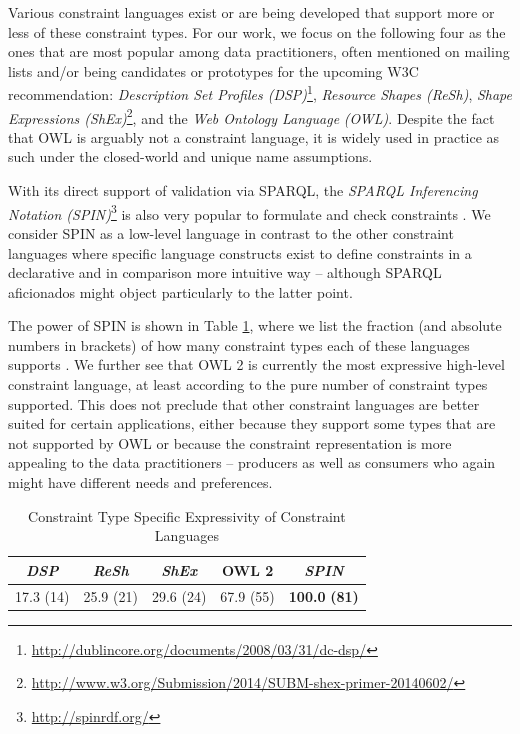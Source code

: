 \documentclass[a4paper,fontsize=11pt]{scrartcl}
\begin{document}
Various constraint languages exist or are being developed that support more or less of these constraint types. For our work, we focus on the following four as the ones that are most popular among data practitioners, often mentioned on mailing lists and/or being candidates or prototypes for the upcoming W3C recommendation:
\emph{Description Set Profiles (DSP)}\footnote{\url{ http://dublincore.org/documents/2008/03/31/dc-dsp/}}, \emph{Resource Shapes (ReSh)}, \emph{Shape Expressions (ShEx)}\footnote{\url{http://www.w3.org/Submission/2014/SUBM-shex-primer-20140602/}}, and the \emph{Web Ontology Language} \emph{(OWL)}. Despite the fact that OWL is arguably not a constraint language, it is widely used in practice as such under the closed-world and unique name assumptions.

With its direct support of validation via SPARQL, the \emph{SPARQL Inferencing Notation (SPIN)}\footnote{\url{http://spinrdf.org/}} is also very popular to formulate and check constraints \cite{Fuerber2010}. We consider SPIN as a low-level language in contrast to the other constraint languages where specific language constructs exist to define constraints in a declarative and in comparison more intuitive way -- although SPARQL aficionados might object particularly to the latter point.

The power of SPIN is shown in 
Table \ref{tab:constraint-type-specific-expressivity}, where we list the fraction (and absolute numbers in brackets) of how many constraint types each of these languages supports \cite{BoschNolleAcarEckert2015}. 
We further see that OWL 2 is currently the most expressive high-level constraint language, at least according to the pure number of constraint types supported. This does not preclude that other constraint languages are better suited for certain applications, either because they support some types that are not supported by OWL or because the constraint representation is more appealing to the data practitioners -- producers as well as consumers who again might have different needs and preferences.

\begin{table}[H]
	\centering
		\caption{Constraint Type Specific Expressivity of Constraint Languages}
	  \scriptsize
		\begin{tabular}{c|c|c|c|c}
			\emph{DSP} & \emph{ReSh} & \emph{ShEx} & OWL 2 & \emph{SPIN} \\	
      \hline
			17.3 (14) & 25.9 (21) & 29.6 (24) & 67.9 (55) & \textbf{100.0} \textbf{(81)} 
		\end{tabular}
	\label{tab:constraint-type-specific-expressivity}
\end{table}
\end{document}
